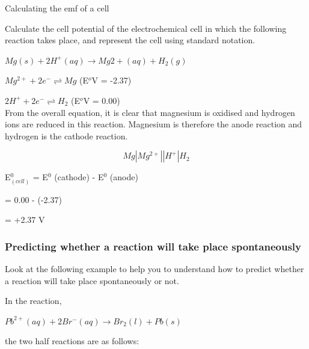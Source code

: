 \begin{wex}{Calculating the emf of a cell}{Calculate the cell potential of the electrochemical cell in which the following reaction takes place, and represent the cell using standard notation.

\begin{center}
\rm${Mg(s) + 2H^{+}(aq) \rightarrow Mg{2+}(aq) + H_{2}(g)}$
\end{center}
}

{
\rm${Mg^{2+} + 2e^{-} \rightleftharpoons Mg}$ (E$^{o}$V = -2.37)

\rm${2H^{+} + 2e^{-} \rightleftharpoons H_{2}}$ (E$^{o}$V = 0.00)\\

From the overall equation, it is clear that magnesium is oxidised and hydrogen ions are reduced in this reaction. Magnesium is therefore the anode reaction and hydrogen is the cathode reaction.

\begin{equation*}
Mg|Mg^{2+}||H^{+}|H_{2}
\end{equation*}

E$^{0}_{(cell)}$ = E$^{0}$ (cathode) - E$^{0}$ (anode)

= 0.00 - (-2.37)

= +2.37 V
}
\end{wex}

\subsubsection{Predicting whether a reaction will take place spontaneously}

Look at the following example to help you to understand how to predict whether a reaction will take place spontaneously or not.

In the reaction,

\begin{center}
\rm${Pb^{2+}(aq) + 2Br^{-}(aq) \rightarrow Br_{2}(l) + Pb(s)}$
\end{center}

the two half reactions are as follows:

